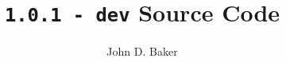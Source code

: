 %
%



\author{John D. Baker}
\title{\texttt{1.0.1 - dev} Source Code}

\setlength{\columnsep}{3em}
\setlength{\columnseprule}{0.5pt}
\twocolumn

\maketitle
\tableofcontents
\onecolumn

\newpage


\newpage


\newpage


\newpage


\newpage


\newpage


%

\newpage
{}
{}
\printindex


